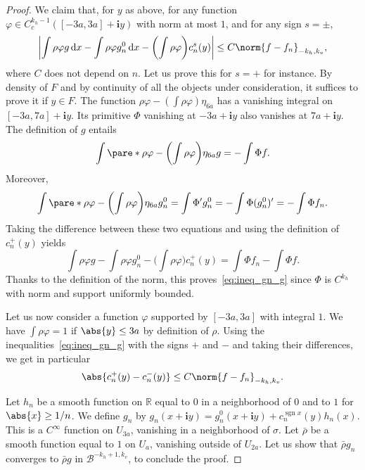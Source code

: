 \documentclass[JEP,XML,SOM,Unicode]{cedram}
\newcommand{\boB}{\mathcal{B}}
\newcommand{\R}{\mathbb{R}}
\newcommand{\dd}{\mathop{}\!\mathrm{d}}
\newcommand{\ic}{\mathbf{i}}
\newcommand{\paregg}[1]{\biggl(#1\biggr)}
\newcommand{\absgg}[1]{\biggl \lvert#1\biggr\rvert}
\DeclareMathOperator{\sgn}{sgn}
\let\phi\varphi
\theoremstyle{definition}
\numberwithin{equation}{section}
\begin{document}
\begin{proof}
We claim that, for $y$ as above, for any function $\phi \in C^{k_h-1}_c([-3a,
3a] + \ic y)$ with norm at most $1$, and for any sign $s = \pm$,
\begin{equation}
\label{eq:ineq_gn_g}
\absgg{\int \rho \phi g \dd x - \int \rho \phi g^0_n \dd x - \paregg{\int \rho \phi} c^s_n(y)}
\leq C \norm{f-f_n}_{-k_h, k_v},
\end{equation}
where $C$ does not depend on $n$. Let us prove this for $s=+$ for instance.
By density of $F$ and by continuity of all the objects under consideration,
it suffices to prove it if $y\in F$. The function $\rho \phi -(\int \rho
\phi) \eta_{6a}$ has a vanishing integral on $[-3a, 7a] + \ic y$. Its
primitive $\Phi$ vanishing at $-3a + \ic y$ also vanishes at $7a + \ic y$.
The definition of $g$ entails
\begin{equation*}
\int \pare*{\rho \phi - \paregg{\int \rho \phi} \eta_{6a}} g = - \int \Phi f.
\end{equation*}
Moreover,
\begin{equation*}
\int \pare*{\rho \phi - \paregg{\int \rho \phi} \eta_{6a}} g^0_n = \int \Phi' g^0_n = - \int \Phi (g^0_n)' = -\int \Phi f_n.
\end{equation*}
Taking the difference between these two equations and using the definition of
$c_n^+(y)$ yields
\begin{equation*}
\int \rho \phi g - \int \rho \phi g^0_n - \paregg{\int \rho \phi} c_n^+(y) = \int \Phi f_n - \int \Phi f.
\end{equation*}
Thanks to the definition of the norm, this proves~\eqref{eq:ineq_gn_g} since
$\Phi$ is $C^{k_h}$ with norm and support uniformly bounded.

Let us now consider a function $\phi$ supported by $[-3a,3a]$ with integral
$1$. We have $\int \rho \phi = 1$ if $\abs{y} \leq 3a$ by definition of
$\rho$. Using the inequalities~\eqref{eq:ineq_gn_g} with the signs $+$ and
$-$ and taking their differences, we get in particular
\begin{equation}
\label{eq:cn_pm_diff}
\abs{c^+_n(y) - c^-_n(y)} \leq C \norm{f-f_n}_{-k_h, k_v}.
\end{equation}

Let $h_n$ be a smooth function on $\R$ equal to $0$ in a neighborhood of $0$
and to $1$ for $\abs{x} \geq 1/n$. We define $g_n$ by $g_n(x + \ic y) =
g_n^0(x+\ic y) + c_n^{\sgn x}(y) h_n(x)$. This is a $C^\infty$ function on
$U_{3a}$, vanishing in a neighborhood of $\sigma$. Let $\bar\rho$ be a smooth
function equal to $1$ on $U_a$, vanishing outside of $U_{2a}$. Let us show
that $\bar\rho g_n$ converges to $\bar\rho g$ in $\boB^{-k_h+1, k_v}$, to
conclude the proof.


\end{proof}
\end{document}
